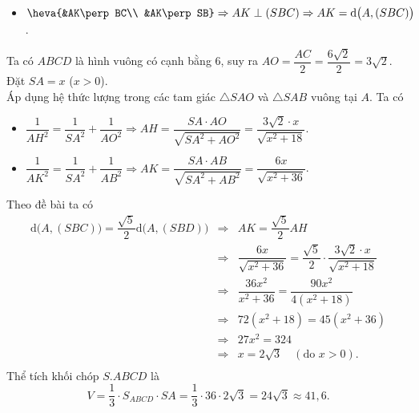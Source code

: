 \begin{ex}
{\begin{itemize}
			\item $\heva{&AK\perp BC\\
				&AK\perp SB}\Rightarrow AK\perp (SBC)\Rightarrow AK=\mathrm{d}\big(A,(SBC)\big)$.
		\end{itemize}
		Ta có $ABCD$ là hình vuông có cạnh bằng $6$, suy ra $AO=\dfrac{AC}{2} =\dfrac{6\sqrt{2}}{2}=3\sqrt{2}$. Đặt $SA =x$ ($x>0$).\\
		Áp dụng hệ thức lượng trong các tam giác $\triangle SAO$ và $\triangle SAB$ vuông tại $A$. Ta có
		\begin{itemize}
			\item $\dfrac{1}{AH^2} = \dfrac{1}{SA^2} + \dfrac{1}{AO^2}\Rightarrow
			AH=\dfrac{SA\cdot AO}{\sqrt{SA^2+ AO^2}}=\dfrac{3\sqrt{2} \cdot x}{\sqrt{x^2+18}}$.
			\item $\dfrac{1}{AK^2} = \dfrac{1}{SA^2} + \dfrac{1}{AB^2}\Rightarrow
			AK=\dfrac{SA\cdot AB}{\sqrt{SA^2+ AB^2}}=\dfrac{6x}{\sqrt{x^2+ 36}}$.
		\end{itemize}
		Theo đề bài ta có
		\allowdisplaybreaks
		\begin{eqnarray*}
			\mathrm{d}\big(A,(SBC)\big)=\dfrac{\sqrt{5}}{2}\mathrm{d}\big(A,(SBD)\big)
			&\Rightarrow& AK = \dfrac{\sqrt{5}}{2}AH\\
			&\Rightarrow&\dfrac{6x}{\sqrt{x^2+ 36}}=\dfrac{\sqrt{5}}{2}\cdot \dfrac{3\sqrt{2} \cdot x}{\sqrt{x^2+18}}\\
			&\Rightarrow& \dfrac{36x^2}{x^2+ 36}= \dfrac{90x^2}{4(x^2+18)}\\
			&\Rightarrow& 72(x^2+18)=45(x^2+36)\\
			&\Rightarrow& 27 x^2= 324\\
			&\Rightarrow& x= 2\sqrt{3} \quad (\text{do} \,\, x>0).\\
		\end{eqnarray*}
		Thể tích khối chóp $S.ABCD$ là
		\[V = \dfrac{1}{3} \cdot S_{ABCD} \cdot SA= \dfrac{1}{3} \cdot 36 \cdot 2\sqrt{3} =24\sqrt{3}\approx 41{,}6.\]
	}
\end{ex}

